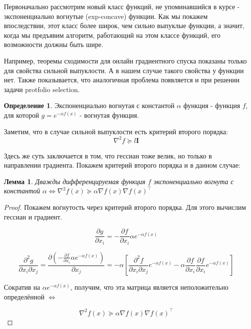 \documentclass[12pt]{article}
\newtheorem*{lemma}{Лемма}
\theoremstyle{definition}
\newtheorem*{definition}{Определение}
\begin{document}
\bigskip
Первоначально рассмотрим новый класс функций, не упоминавшийся в курсе - экспоненциально вогнутые (exp-concave) функции. Как мы покажем впоследствии, этот класс более широк, чем сильно выпуклые функции, а значит, когда мы предъявим алгоритм, работающий на этом классе функций, его возможности должны быть шире.

\bigskip
Например, теоремы сходимости для онлайн градиентного спуска показаны только для свойства сильной выпуклости. А в нашем случае такого свойства у функции нет. Также показывается, что аналогичная проблема появляется и при решении задачи protfolio selection.

\bigskip
 
\theoremstyle{definition}
\begin{definition}{Экспоненциально вогнутая с константой $\alpha$ функция}
 - функция $f$, для которой $g = e^{-\alpha f(x)}$ - вогнутая функция.
\end{definition}

Заметим, что в случае сильной выпуклости есть критерий второго порядка: $$\nabla^2 f \succcurlyeq l\mathbf{I}$$

Здесь же суть заключается в том, что гессиан тоже велик, но только в направлении градиента. Покажем критерий второго порядка и в данном случае:

\begin{lemma}
Дважды дифференцируемая функция $f$ экспоненциально вогнута с константой $\alpha \iff \nabla^2 f(x) \succcurlyeq \alpha \nabla f(x) \nabla f(x)^\top$
\end{lemma}

\begin{proof}
Покажем вогнутость через критерий второго порядка. Для этого вычислим гессиан и градиент.

$$ \frac{\partial g}{\partial x_i} = -\frac{\partial f}{\partial x_i} \alpha e^{-\alpha f(x)} $$

$$ \frac{\partial^2 g}{\partial x_i \partial x_j} = \frac{\partial \left(-\frac{\partial f}{\partial x_i} \alpha e^{-\alpha f(x)}\right)}{\partial x_j} = -\alpha \left[ \frac{\partial^2 f}{\partial x_i \partial x_j} e^{-\alpha f(x)} - \alpha \frac{\partial f}{\partial x_i} \frac{\partial f}{\partial x_i} e^{-\alpha f(x)} \right] $$

Сократив на $\alpha e^{-\alpha f(x)}$, получим, что эта матрица является неположительно определённой $\Leftrightarrow$

$$ \nabla^2 f(x) \succcurlyeq \alpha \nabla f(x) \nabla f(x)^\top $$
\end{proof}
\end{document}
